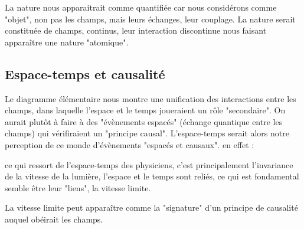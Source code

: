 La nature nous apparaitrait comme quantifiée car nous considérons comme "objet", non pas les champs, mais leurs échanges, leur couplage. La nature serait constituée de champs, continus, leur interaction discontinue nous faisant apparaître une nature "atomique".  

\subsection{Espace-temps et causalité}

Le diagramme élémentaire nous montre une unification des interactions entre les champs, dans laquelle l'espace et le temps joueraient un rôle "secondaire". On aurait plutôt à faire à des "évènements espacés" (échange quantique entre les champs) qui vérifiraient un "principe causal". L'espace-temps serait alors notre perception de ce monde d'évènements "espacés et causaux". en effet :

ce qui ressort de l'espace-temps des physiciens, c'est principalement l'invariance de la vitesse de la lumière, l'espace et le temps sont reliés, ce qui est fondamental semble être leur "liens", la vitesse limite.

La vitesse limite peut apparaître comme la "signature" d'un principe de causalité auquel obéirait les champs.
